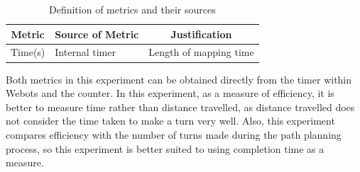 \documentclass[conference]{IEEEtran}
\begin{document}
\begin{table}[htbp]
\centering
\caption{Definition of metrics and their sources}
\label{Table1}
\begin{tabular}{c|l|c}
\hline
Metric                               & \multicolumn{1}{c|}{Source of Metric} & Justification          \\ \hline
Time(s)                              & Internal timer                        & Length of mapping time \\ \hline
\end{tabular}
\end{table}

Both metrics in this experiment can be obtained directly from the timer within Webots and the counter. In this experiment, as a measure of efficiency, it is better to measure time rather than distance travelled, as distance travelled does not consider the time taken to make a turn very well. Also, this experiment compares efficiency with the number of turns made during the path planning process, so this experiment is better suited to using completion time as a measure.
\end{document}
